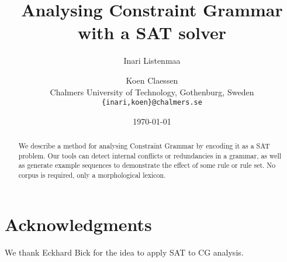 \documentclass[11pt]{article}
\title{Analysing Constraint Grammar with a SAT solver}
\author{Inari Listenmaa \and Koen Claessen \\
 Chalmers University of Technology, Gothenburg, Sweden \\
 {\tt \{inari,koen\}@chalmers.se} }
\date{\today}
\begin{document}
\maketitle

\begin{abstract}
We describe a method for analysing Constraint Grammar by encoding it
as a SAT problem.
Our tools can detect internal conflicts or redundancies in a grammar,
as well as generate example sequences to demonstrate the effect of some rule or rule set.
No corpus is required, only a morphological lexicon.
\end{abstract}








\section*{Acknowledgments}
We thank Eckhard Bick for the idea to apply SAT to CG analysis. 




\end{document}
